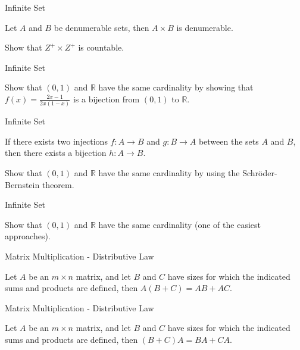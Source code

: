 \documentclass{beamer}
\begin{document}
\begin{frame}[t]{Infinite Set}
    \begin{theorem}
        Let $A$ and $B$ be denumerable sets, then $A \times B$ is denumerable. 
    \end{theorem}
    \begin{example}
        Show that $Z^+ \times Z^+$ is countable. 
    \end{example}
\end{frame}

\begin{frame}[t]{Infinite Set}
    \begin{example}
        Show that $(0,1)$ and $\mathbb{R}$ have the same cardinality by showing that $f(x) = \frac{2x-1}{2x(1-x)}$ is a bijection from $(0,1)$ to $\mathbb{R}$.
    \end{example}
\end{frame}

\begin{frame}[t]{Infinite Set}
    \begin{theorem}
        If there exists two injections $f: A \to B$ and $g: B \to A$ between the sets $A$ and $B$, then there exists a bijection $h: A \to B$. 
    \end{theorem}
    \begin{example}
        Show that $(0,1)$ and $\mathbb{R}$ have the same cardinality by using the Schr\"{o}der-Bernstein theorem. 
    \end{example}
\end{frame}

\begin{frame}[t]{Infinite Set}
    \begin{example}
        Show that $(0,1)$ and $\mathbb{R}$ have the same cardinality (one of the easiest approaches).
    \end{example}
\end{frame}

\begin{frame}[t]{Matrix Multiplication - Distributive Law}
    \begin{theorem}
        Let $A$ be an $m \times n$ matrix, and let $B$ and $C$ have sizes for which the indicated sums and products are defined, then $A(B + C) = AB + AC$. 
    \end{theorem}
\end{frame}

\begin{frame}[t]{Matrix Multiplication - Distributive Law}
    \begin{theorem}
        Let $A$ be an $m \times n$ matrix, and let $B$ and $C$ have sizes for which the indicated sums and products are defined, then $(B + C)A = BA + CA$. 
    \end{theorem}
\end{frame}
\end{document}
